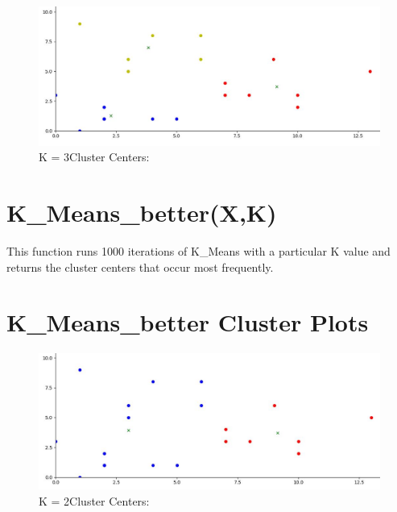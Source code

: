 \documentclass{article}
\begin{document}
\begin{figure}[h!]
\centering
\includegraphics[scale=.5]{cluster_k3}
\caption{K = 3\newline Cluster Centers: \newline[9.142857142857142, 3.7142857142857144]\newline[2.2857142857142856, 1.2857142857142858]\newline[3.8333333333333335, 7.0]}
\label{fig:universe}
\end{figure}

\section{K\_Means\_better(X,K)}
This function runs 1000 iterations of K\_Means with a particular K value and returns the cluster centers that occur most frequently.

\section{K\_Means\_better Cluster Plots}


\begin{figure}[h!]
\centering
\includegraphics[scale=.5]{cluster_k2}
\caption{K = 2\newline Cluster Centers: \newline[9.142857142857142, 3.7142857142857144]\newline[3.0, 3.923076923076923]}
\label{fig:universe}
\end{figure}
\end{document}
